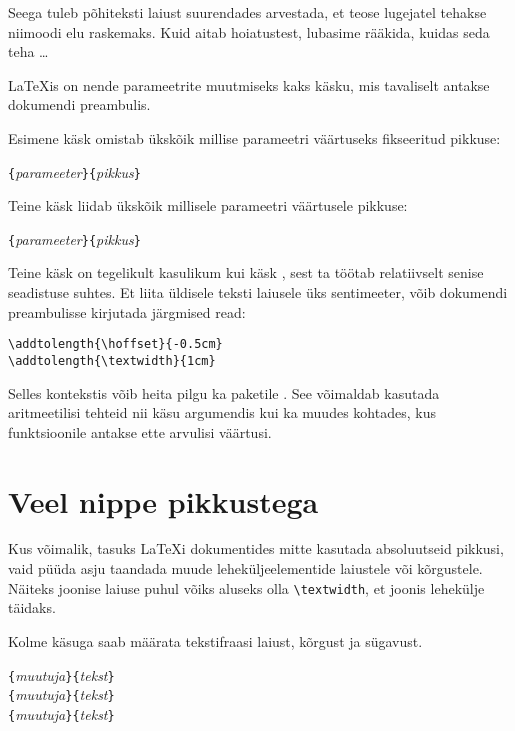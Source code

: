 Seega tuleb põhiteksti laiust suurendades arvestada, et teose lugejatel
tehakse niimoodi elu raskemaks. Kuid aitab hoiatustest, lubasime
rääkida, kuidas seda teha \ldots

\LaTeX is on nende parameetrite muutmiseks kaks käsku, mis tavaliselt
antakse dokumendi preambulis.

Esimene käsk omistab ükskõik millise parameetri väärtuseks fikseeritud
pikkuse:
\begin{lscommand}
\verb|{|\emph{parameeter}\verb|}{|\emph{pikkus}\verb|}|
\end{lscommand}
\noindent Teine käsk liidab ükskõik millisele parameetri väärtusele
pikkuse:
\begin{lscommand}
\verb|{|\emph{parameeter}\verb|}{|\emph{pikkus}\verb|}|
\end{lscommand}

Teine käsk on tegelikult kasulikum kui käsk , sest ta
töötab relatiivselt senise seadistuse suhtes. Et liita üldisele teksti
laiusele üks sentimeeter, võib dokumendi preambulisse kirjutada
järgmised read:
\begin{code}
\verb|\addtolength{\hoffset}{-0.5cm}|\\
\verb|\addtolength{\textwidth}{1cm}|
\end{code}

Selles kontekstis võib heita pilgu ka paketile . See võimaldab
kasutada aritmeetilisi tehteid nii käsu  argumendis kui ka
muudes kohtades, kus funktsioonile antakse ette arvulisi väärtusi.

\section{Veel nippe pikkustega}

Kus võimalik, tasuks \LaTeX i dokumentides mitte kasutada absoluutseid
pikkusi, vaid püüda asju taandada muude leheküljeelementide laiustele
või kõrgustele. Näiteks joonise laiuse puhul võiks aluseks olla
\verb|\textwidth|, et joonis lehekülje täidaks.

Kolme käsuga saab määrata tekstifraasi laiust, kõrgust ja sügavust.

\begin{lscommand}
\verb|{|\emph{muutuja}\verb|}{|\emph{tekst}\verb|}|\\
\verb|{|\emph{muutuja}\verb|}{|\emph{tekst}\verb|}|\\
\verb|{|\emph{muutuja}\verb|}{|\emph{tekst}\verb|}|
\end{lscommand}

